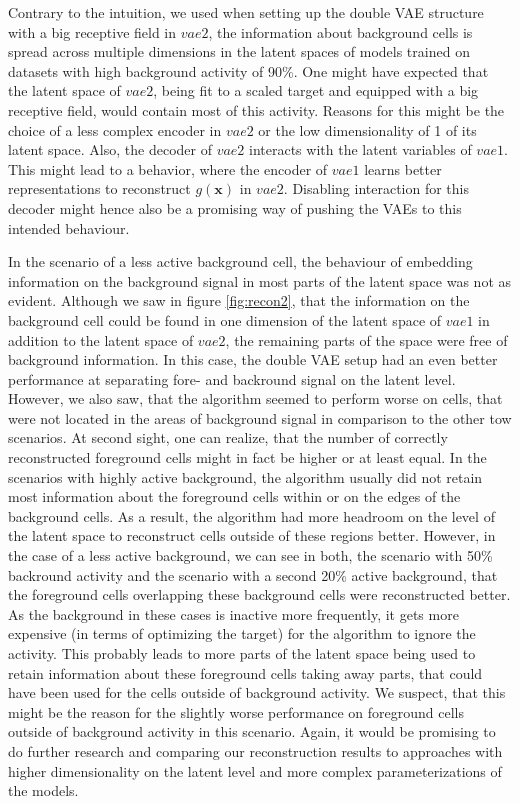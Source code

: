 \documentclass[12pt]{report}
\theoremstyle{definition}
\begin{document}
Contrary to the intuition, we used when setting up the double VAE structure with a big receptive field in $vae2$, the information about background cells is spread across multiple dimensions in the latent spaces of models trained on datasets with high background activity of 90\%. One might have expected that the latent space of $vae2$, being fit to a scaled target and equipped with a big receptive field, would contain most of this activity. Reasons for this might be the choice of a less complex encoder in $vae2$ or the low dimensionality of 1 of its latent space. Also, the decoder of $vae2$ interacts with the latent variables of $vae1$. This might lead to a behavior, where the encoder of $vae1$ learns better representations to reconstruct $g(\mathbf{x})$ in $vae2$. Disabling interaction for this decoder might hence also be a promising way of pushing the VAEs to this intended behaviour.

In the scenario of a less active background cell, the behaviour of embedding information on the background signal in most parts of the latent space was not as evident. Although we saw in figure \ref{fig:recon2}, that the information on the background cell could be found in one dimension of the latent space of $vae1$ in addition to the latent space of $vae2$, the remaining parts of the space were free of background information. In this case, the double VAE setup had an even better performance at separating fore- and backround signal on the latent level. However, we also saw, that the algorithm seemed to perform worse on cells, that were not located in the areas of background signal in comparison to the other tow scenarios. At second sight, one can realize, that the number of correctly reconstructed foreground cells might in fact be higher or at least equal. In the scenarios with highly active background, the algorithm usually did not retain most information about the foreground cells within or on the edges of the background cells. As a result, the algorithm had more headroom on the level of the latent space to reconstruct cells outside of these regions better. However, in the case of a less active background, we can see in both, the scenario with 50\% backround activity and the scenario with a second 20\% active background, that the foreground cells overlapping these background cells were reconstructed better. As the background in these cases is inactive more frequently, it gets more expensive (in terms of optimizing the target) for the algorithm to ignore the activity. This probably leads to more parts of the latent space being used to retain information about these foreground cells taking away parts, that could have been used for the cells outside of background activity. We suspect, that this might be the reason for the slightly worse performance on foreground cells outside of background activity in this scenario. Again, it would be promising to do further research and comparing our reconstruction results to approaches with higher dimensionality on the latent level and more complex parameterizations of the models. 
\end{document}
